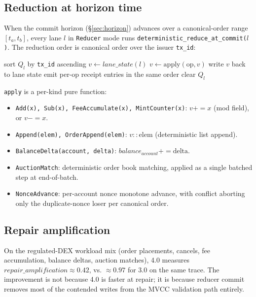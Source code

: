 \subsection{Reduction at horizon time}

When the commit horizon (\S\ref{sec:horizon}) advances over a
canonical-order range $[t_a, t_b]$, every lane $l$ in
\texttt{Reducer} mode runs \texttt{deterministic\_reduce\_at\_commit($l$)}.
The reduction order is canonical order over the issuer \texttt{tx\_id}:

\begin{algorithm}[ht]
\caption{\texttt{deterministic\_reduce\_at\_commit($l$)}}
\label{alg:reduce}
\begin{algorithmic}[1]
\State sort $\mathit{Q}_l$ by \texttt{tx\_id} ascending
\State $v \gets \mathit{lane\_state}(l)$
  \State $v \gets \mathrm{apply}(\mathrm{op}, v)$
\EndFor
\State write $v$ back to lane state
\State emit per-op receipt entries in the same order
\State clear $\mathit{Q}_l$
\end{algorithmic}
\end{algorithm}

\texttt{apply} is a per-kind pure function:
\begin{itemize}[leftmargin=2em]
\item \texttt{Add(x), Sub(x), FeeAccumulate(x), MintCounter(x)}: $v \mathrel{{+}{=}} x$ (mod field), or $v \mathrel{{-}{=}} x$.
\item \texttt{Append(elem), OrderAppend(elem)}: $v \mathrel{{:}{:}} \mathrm{elem}$ (deterministic list append).
\item \texttt{BalanceDelta(account, delta)}: $\mathit{balance}_{\mathit{account}} \mathrel{{+}{=}} \mathrm{delta}$.
\item \texttt{AuctionMatch}: deterministic order book matching, applied as a single batched step at end-of-batch.
\item \texttt{NonceAdvance}: per-account nonce monotone advance, with conflict aborting only the duplicate-nonce loser per canonical order.
\end{itemize}

\subsection{Repair amplification}

On the regulated-DEX workload mix (order placements, cancels, fee
accumulation, balance deltas, auction matches), 4.0 measures
$\mathit{repair\_amplification} \approx 0.42$, vs. $\approx 0.97$ for
3.0 on the same trace. The improvement is not because 4.0 is faster at
repair; it is because reducer commit removes most of the contended
writes from the MVCC validation path entirely.

